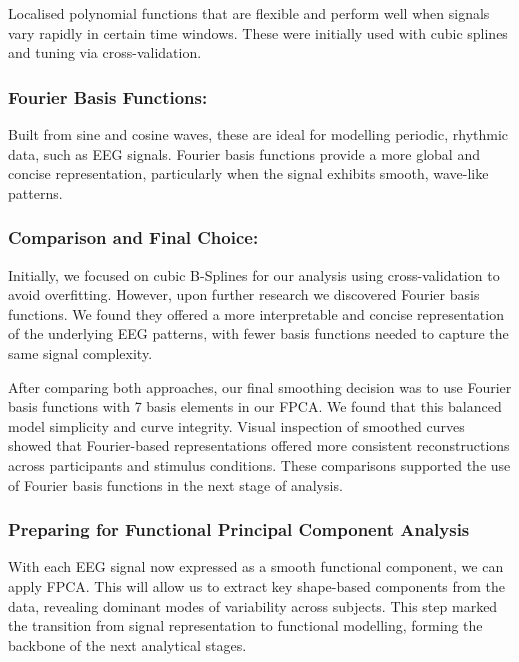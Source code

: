 \documentclass{article}
\begin{document}
Localised polynomial functions that are flexible and perform well when
signals vary rapidly in certain time windows. These were initially used
with cubic splines and tuning via cross-validation.

\subsubsection{Fourier Basis Functions:}\label{fourier-basis-functions}

Built from sine and cosine waves, these are ideal for modelling
periodic, rhythmic data, such as EEG signals. Fourier basis functions
provide a more global and concise representation, particularly when the
signal exhibits smooth, wave-like patterns.

\subsubsection{Comparison and Final
Choice:}\label{comparison-and-final-choice}

Initially, we focused on cubic B-Splines for our analysis using
cross-validation to avoid overfitting. However, upon further research we
discovered Fourier basis functions. We found they offered a more
interpretable and concise representation of the underlying EEG patterns,
with fewer basis functions needed to capture the same signal complexity.

After comparing both approaches, our final smoothing decision was to use
Fourier basis functions with 7 basis elements in our FPCA. We found that
this balanced model simplicity and curve integrity. Visual inspection of
smoothed curves showed that Fourier-based representations offered more
consistent reconstructions across participants and stimulus conditions.
These comparisons supported the use of Fourier basis functions in the
next stage of analysis.

\subsubsection{Preparing for Functional Principal Component
Analysis}\label{preparing-for-functional-principal-component-analysis}

With each EEG signal now expressed as a smooth functional component, we
can apply FPCA. This will allow us to extract key shape-based components
from the data, revealing dominant modes of variability across subjects.
This step marked the transition from signal representation to functional
modelling, forming the backbone of the next analytical stages.
\end{document}

